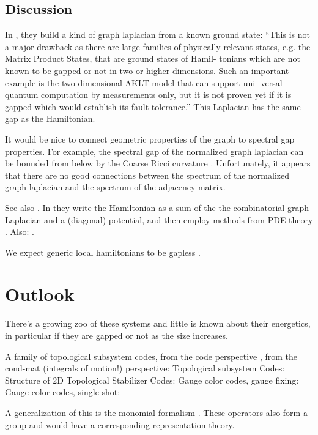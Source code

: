 \documentclass[12pt]{article}
\begin{document}
\subsection{Discussion}

In \cite{AlShimary2010}, they 
build a kind of graph laplacian from a known ground state:
``This is not a major drawback as there
are large families of physically relevant states, e.g. the
Matrix Product States, that are ground states of Hamil-
tonians which are not known to be gapped or not in two
or higher dimensions. Such an important example is
the two-dimensional AKLT model that can support uni-
versal quantum computation by measurements only, but
it is not proven yet if it is gapped which would establish
its fault-tolerance.''
This Laplacian has the same gap as the Hamiltonian.

It would be nice to connect geometric properties of the
graph to spectral gap properties. For example, the spectral gap of
the normalized graph laplacian can be bounded from below
by the Coarse Ricci curvature \cite{Lin2011}. 
Unfortunately, it appears
that there are no good connections between the spectrum
of the normalized graph laplacian and the spectrum of the adjacency matrix.

See also \cite{Jarret2014,Jarret2015}. 
In \cite{Jarret2015modulus} they
write the Hamiltonian as a sum of the
the combinatorial graph Laplacian and a (diagonal) potential, 
and then employ methods from PDE theory \cite{Andrews2011}.
Also: \cite{Baume2016}. %

We expect generic local hamiltonians to be gapless \cite{Movassagh2016}.

%
%

\section{Outlook}

There's a growing zoo of these systems and little is known
about their energetics, in particular if they are gapped or
not as the size increases.

A family of topological subsystem codes,
from the code perspective  \cite{Bombin2010,Bombin2014,Suchara2011},
from the cond-mat (integrals of motion!) perspective:
\cite{Kargarian2010,Bombin2009}
Topological subsystem Codes: \cite{Suchara2011}
Structure of 2D Topological Stabilizer Codes: \cite{Bombin2014}
Gauge color codes, gauge fixing: \cite{Bombin2015}
Gauge color codes, single shot: \cite{Bombin2015single}

A generalization of this is the 
monomial formalism \cite{Van2011}. 
These operators also form a group and would
have a corresponding representation theory.





{}

\end{document}
